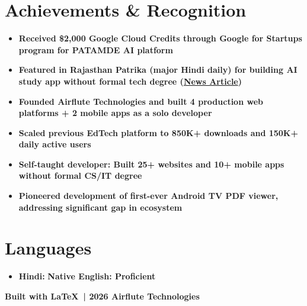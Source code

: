 \documentclass[letterpaper,11pt]{article}
\newcommand{\resumeItem}[1]{\item\small{\bfseries\color{textblack}#1}\vspace{-2pt}}
\renewcommand{\textbf}[1]{{\bfseries\color{headingblack}#1}}
\begin{document}
\vspace{1mm}

\section{Achievements \& Recognition}
\nopagebreak
\begin{itemize}[leftmargin=*]
    \resumeItem{Received \textbf{\$2,000 Google Cloud Credits} through Google for Startups program for PATAMDE AI platform}
    \resumeItem{Featured in \textbf{Rajasthan Patrika} (major Hindi daily) for building AI study app without formal tech degree (\href{https://www.patrika.com/churu-news/google-gave-funding-to-software-developer-pawan-joshi-created-study-ai-app-patamda-without-degree-20092677}{\color{linkblue}News Article})}
    \resumeItem{Founded Airflute Technologies and built \textbf{4 production web platforms + 2 mobile apps} as a solo developer}
    \resumeItem{Scaled previous EdTech platform to \textbf{850K+ downloads} and \textbf{150K+ daily active users}}
    \resumeItem{Self-taught developer: Built \textbf{25+ websites} and \textbf{10+ mobile apps} without formal CS/IT degree}
    \resumeItem{Pioneered development of \textbf{first-ever Android TV PDF viewer}, addressing significant gap in ecosystem}
\end{itemize}

\vspace{1mm}

\section{Languages}
\nopagebreak
\begin{itemize}[leftmargin=*]
    \item \textbf{Hindi:} \bfseries\color{textblack}Native \hfill \textbf{English:} \bfseries\color{textblack}Proficient
\end{itemize}

\vfill
\begin{center}
{\small \color{black} \bfseries Built with \LaTeX\ | 2026 Airflute Technologies}
\end{center}
\end{document}

